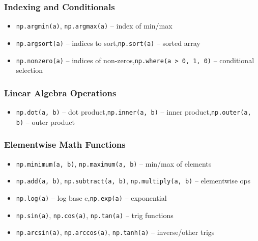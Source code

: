 \documentclass{article}
\begin{document}
\subsubsection*{Indexing and Conditionals}
\begin{itemize}
    \item \texttt{np.argmin(a)}, \texttt{np.argmax(a)} -- index of min/max
    \item \texttt{np.argsort(a)} -- indices to sort,\quad \texttt{np.sort(a)} -- sorted array
    \item \texttt{np.nonzero(a)} -- indices of non-zeros,\quad \texttt{np.where(a > 0, 1, 0)} -- conditional selection
\end{itemize}

\subsubsection*{Linear Algebra Operations}
\begin{itemize}
    \item \texttt{np.dot(a, b)} -- dot product,\quad \texttt{np.inner(a, b)} -- inner product,\quad \texttt{np.outer(a, b)} -- outer product
\end{itemize}

\subsubsection*{Elementwise Math Functions}
\begin{itemize}
    \item \texttt{np.minimum(a, b)}, \texttt{np.maximum(a, b)} -- min/max of elements
    \item \texttt{np.add(a, b)}, \texttt{np.subtract(a, b)}, \texttt{np.multiply(a, b)} -- elementwise ops
    \item \texttt{np.log(a)} -- log base e,\quad \texttt{np.exp(a)} -- exponential
    \item \texttt{np.sin(a)}, \texttt{np.cos(a)}, \texttt{np.tan(a)} -- trig functions
    \item \texttt{np.arcsin(a)}, \texttt{np.arccos(a)}, \texttt{np.tanh(a)} -- inverse/other trigs
\end{itemize}
\end{document}
